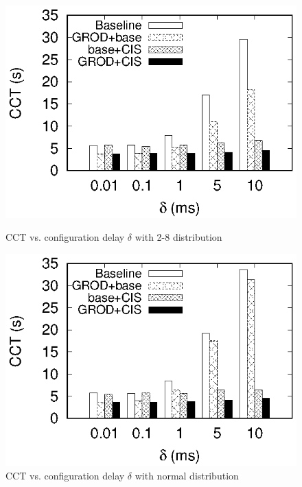 \begin{figure}
\begin{minipage}[c]{0.23\textwidth}
\includegraphics[width=1\textwidth]{28_delta_cct_histogram.eps}
\caption{CCT vs. configuration delay $\delta$ with 2-8 distribution $\qquad\qquad$}\label{fig:28_delta_cct_histogram}
\end{minipage}
\hspace{1mm}
\begin{minipage}[c]{0.23\textwidth}
\centering

\includegraphics[width=1\textwidth]{normal_delta_cct_histogram.eps}
\caption{CCT vs. configuration delay $\delta$ with normal distribution$\qquad$ $\qquad$}\label{fig:normal_delta_cct_histogram}
\end{minipage}
\vspace{0cm}

\begin{minipage}[c]{0.23\textwidth}
\centering


\end{minipage}
\end{figure}
